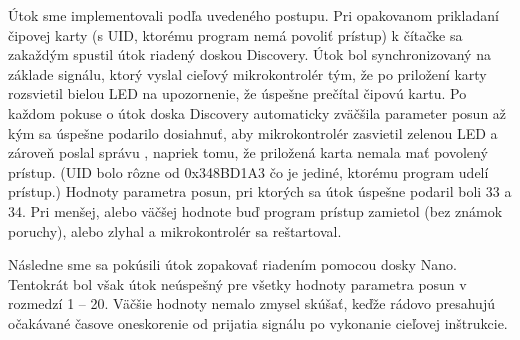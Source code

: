 Útok sme implementovali podľa uvedeného postupu. Pri opakovanom prikladaní čipovej karty (s UID, ktorému program nemá povoliť prístup) k čítačke sa zakaždým spustil útok riadený doskou Discovery. Útok bol synchronizovaný na základe signálu, ktorý vyslal cieľový mikrokontrolér tým, že po priložení karty rozsvietil bielou LED na upozornenie, že úspešne prečítal čipovú kartu. Po každom pokuse o útok doska Discovery automaticky zväčšila parameter posun až kým sa úspešne podarilo dosiahnuť, aby mikrokontrolér zasvietil zelenou LED a zároveň poslal správu , napriek tomu, že priložená karta nemala mať povolený prístup. (UID bolo rôzne od 0x348BD1A3 čo je jediné, ktorému program udelí prístup.) Hodnoty parametra posun, pri ktorých sa útok úspešne podaril boli 33 a 34. Pri menšej, alebo väčšej hodnote buď program prístup zamietol (bez známok poruchy), alebo zlyhal a mikrokontrolér sa reštartoval.

Následne sme sa pokúsili útok zopakovať riadením pomocou dosky Nano. Tentokrát bol však útok neúspešný pre všetky hodnoty parametra posun v rozmedzí 1 -- 20. Väčšie hodnoty nemalo zmysel skúšať, keďže rádovo presahujú očakávané časove oneskorenie od prijatia signálu po vykonanie cieľovej inštrukcie.